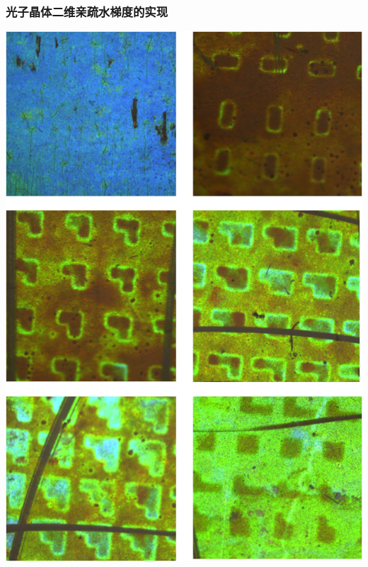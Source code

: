 \documentclass{beamer}
\begin{document}
\begin{frame}
  \frametitle{光子晶体二维亲疏水梯度的实现}
  \begin{minipage}{0.48\textwidth}
  \centering
    \includegraphics[width=0.85\linewidth]{figures/2D-gradient.png}
  \end{minipage}
  \hfill
  \begin{minipage}{0.48\textwidth}
    \centering

\end{minipage}
\end{frame}
\end{document}
